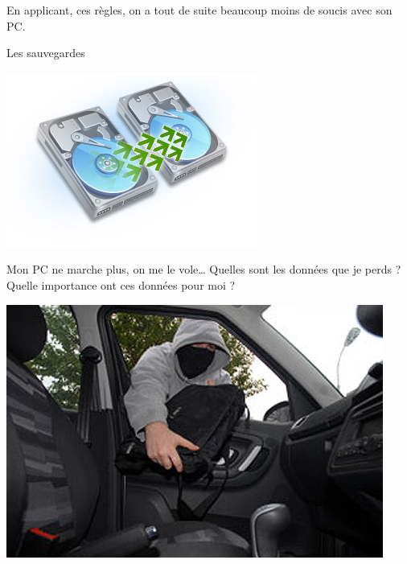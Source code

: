 \documentclass{beamer}
\begin{document}
\begin{frame}
\begin{center}
\Huge{En applicant, ces règles, on a tout de suite beaucoup moins de soucis avec son PC.}
\end{center}
\end{frame}


\begin{frame}
\begin{center}
\Huge{Les sauvegardes}

\includegraphics[scale=0.5] {./images/backup.jpg}
\end{center}
\end{frame}

\begin{frame}
\begin{center}
\Huge{Mon PC ne marche plus, on me le vole…
Quelles sont les données que je perds ?
Quelle importance ont ces données pour moi ?
}

\includegraphics[scale=0.5] {./images/laptopthief.jpg}
\end{center}

\end{frame}
\end{document}

